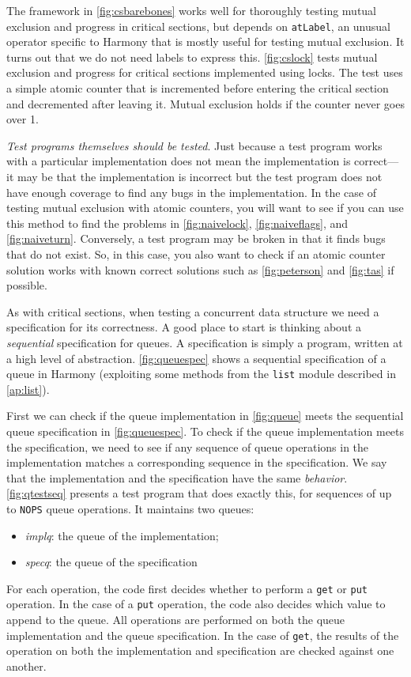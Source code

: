 \documentclass{report}
\begin{document}
The framework in \autoref{fig:csbarebones} works well for thoroughly
testing mutual exclusion and progress in critical sections, but depends
on \texttt{atLabel}, an unusual operator specific to Harmony that is mostly
useful for testing mutual exclusion.
It turns out that we do not need labels to express this.
\autoref{fig:cslock} tests mutual exclusion and progress for
critical sections implemented using locks.
The test uses a simple atomic counter that is incremented before entering
the critical section and decremented after leaving it.
Mutual exclusion holds if the counter never goes over 1.

\emph{Test programs themselves should be tested}.
Just because a test program works with a particular implementation
does not mean the implementation is correct---it may be that the implementation
is incorrect but the test program does not have enough coverage to find any
bugs in the implementation.
In the case of testing mutual exclusion with atomic counters, you will want
to see if you can use this method to find the problems in \autoref{fig:naivelock},
\autoref{fig:naiveflags},
and \autoref{fig:naiveturn}.
Conversely, a test program may be broken in that it finds bugs that do not exist.
So, in this case,
you also want to check if an atomic counter solution works with known
correct solutions such as \autoref{fig:peterson} and \autoref{fig:tas}
if possible.

As with critical sections, when testing a concurrent data structure
we need a specification for its correctness.
A good place to start is thinking about a \emph{sequential} specification
for queues.
A specification is simply a program, written at a high level of
abstraction.
\autoref{fig:queuespec} shows a sequential specification of a
queue in Harmony (exploiting some methods from the \texttt{list}
module described in \autoref{ap:list}).

First we can check if the queue implementation
in \autoref{fig:queue} meets the sequential
queue specification in \autoref{fig:queuespec}.
To check if the queue implementation meets the specification,
we need to see if any sequence of queue operations in the
implementation matches a corresponding sequence in the
specification.
We say that the implementation and the specification
have the same \emph{behavior}.
%
\autoref{fig:qtestseq} presents a test program that does
exactly this, for sequences of up to \texttt{NOPS}
queue operations.
It maintains two queues:
\begin{itemize}
\item[] \textit{implq}: the queue of the implementation;
\item[] \textit{specq}: the queue of the specification
\end{itemize}
For each operation, the code first decides whether to
perform a \texttt{get} or \texttt{put} operation.
In the case of a \texttt{put} operation, the code also
decides which value to append to the queue.
All operations are performed on both the queue implementation
and the queue specification.
In the case of \texttt{get}, the results of the operation
on both the implementation and specification are checked against one another.
\end{document}
